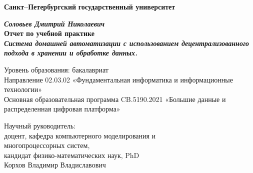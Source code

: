 
\begin{titlepage}
\begin{center}

\textbf{Санкт--Петербургский}
\textbf{государственный университет}

\vspace{35mm}

\textbf{\textit{\large Соловьев Дмитрий Николаевич}} \\[8mm]
\textbf{\large Отчет по учебной практике }\\[3mm]
\textbf{\textit{\large Система домашней автоматизации с использованием децентрализованного подхода в хранении и обработке данных.}}

\vspace{20mm}
Уровень образования: бакалавриат\\
Направление 02.03.02  «Фундаментальная информатика и информационные технологии»\\
Основная образовательная программа CB.5190.2021
«Большие данные и распределенная цифровая платформа»\\[25mm]


\begin{flushright}
\begin{minipage}[t]{0.65\textwidth}
{Научный руководитель:} \\
доцент, кафедра компьютерного моделирования и \\многопроцессорных систем,\\ кандидат физико-математических наук, PhD\\Корхов Владимир Владиславович


\end{minipage}
\end{flushright}
\end{center}
\end{titlepage}
